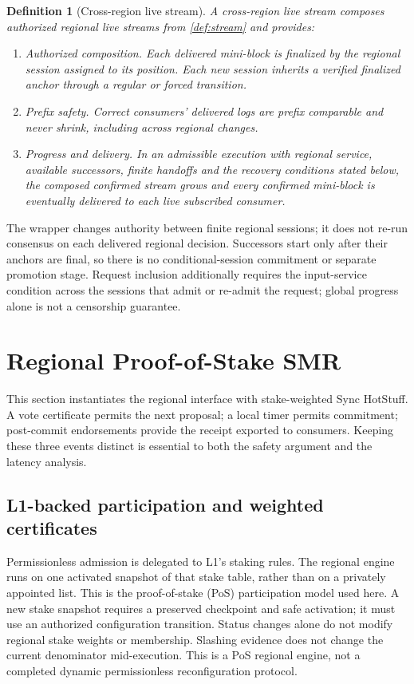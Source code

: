 \documentclass[11pt,a4paper,onecolumn]{article}
\newtheorem{definition}{Definition}[section]
\newcounter{protocol}
\begin{document}
\begin{definition}[Cross-region live stream]\label{def:xstream}
A cross-region live stream composes authorized regional live streams from
\cref{def:stream} and provides:
\begin{enumerate}[label=(\roman*)]
\item \emph{Authorized composition.} Each delivered mini-block is finalized
by the regional session assigned to its position. Each new session inherits
a verified finalized anchor through a regular or forced transition.
\item \emph{Prefix safety.} Correct consumers' delivered logs are prefix
comparable and never shrink, including across regional changes.
\item \emph{Progress and delivery.} In an admissible execution with regional
service, available successors, finite handoffs and the recovery conditions
stated below, the composed confirmed stream grows and every confirmed
mini-block is eventually delivered to each live subscribed consumer.
\end{enumerate}
\end{definition}
The wrapper changes authority between finite regional sessions; it does not
re-run consensus on each delivered regional decision. Successors start
only after their anchors are final, so there is no conditional-session
commitment or separate promotion stage. Request inclusion additionally
requires the input-service condition across the sessions that admit or
re-admit the request; global progress alone is not a censorship guarantee.

\section{Regional Proof-of-Stake SMR}\label{sec:protocol}
This section instantiates the regional interface with stake-weighted Sync
HotStuff. A vote certificate permits the next proposal; a local timer
permits commitment; post-commit endorsements provide the receipt exported
to consumers. Keeping these three events distinct is essential to both
the safety argument and the latency analysis.

\subsection{L1-backed participation and weighted certificates}
Permissionless admission is delegated to L1's staking rules. The regional
engine runs on one activated snapshot of that stake table, rather than on a
privately appointed list. This is the proof-of-stake (PoS) participation
model used here. A new stake snapshot requires a preserved checkpoint
and safe activation; it must use an authorized configuration transition.
Status changes alone do not modify regional stake weights or membership. Slashing evidence does not change the current denominator
mid-execution. This is a PoS regional engine, not a completed dynamic
permissionless reconfiguration protocol.
\end{document}
